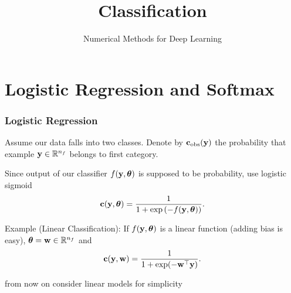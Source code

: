 \documentclass[12pt,fleqn,handout]{beamer}
\title{Classification}
\subtitle{Numerical Methods for Deep Learning}
\date{}
\begin{document}
\makebeamertitle

\section{Logistic Regression and Softmax} %
\label{sec:logistic_regression_and_softmax}

\begin{frame}
	\frametitle{Logistic Regression}
	
	
	Assume our data falls into two classes. Denote by ${\bf c}_{\rm obs}({\bf y})$ the probability that example ${\bf y}\in\mathbb{R}^{n_f}$ belongs to first category.
	
	\bigskip
	
	Since output of our classifier $f({\bf y},{\boldsymbol \theta})$ is supposed to be probability, use logistic sigmoid
	$$
		{\bf c}({\bf y},{\boldsymbol \theta}) = \frac{1}{1 + \exp\left(-f({\bf y},{\boldsymbol \theta})\right)}.
	$$
	
	\bigskip
	
	Example (Linear Classification): If $f({\bf y},{\boldsymbol \theta})$ is a linear function (adding bias is easy), ${\boldsymbol \theta} = {\bf w} \in \mathbb{R}^{n_f}$ and
	$$
		{\bf c}({\bf y},{\bf w}) = \frac{1}{1 + \exp(-{\bf w}^\top{\bf y})}.
	$$
	
	\begin{center}
		from now on consider linear models for simplicity
	\end{center}
	
\end{frame}
\end{document}
